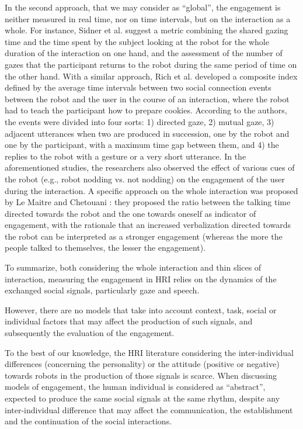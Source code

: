 \documentclass[twocolumn]{svjour3}          %
\renewcommand{\sl}[1]{\color{green} { #1 } \normalcolor}
\begin{document}
In the second approach, that we may consider as ``global'', the engagement is neither measured in real time, nor on time intervals, but on the interaction as a whole. 
For instance, Sidner et al. \cite{sidner2004,sidner2005} suggest a metric combining the shared gazing time and the time spent by the subject looking at the robot for the whole duration of the interaction on one hand, and the assessment of the number of gazes that the participant returns to the robot during the same period of time on the other hand. 
With a similar approach, Rich et al. \cite{rich2010recognizing} developed a composite index defined by the average time intervals between two social connection events between the robot and the user in the course of an interaction, where the robot had to teach the participant how to prepare cookies. According to the authors, the events were divided into four sorts: 1) directed gaze, 2) mutual gaze, 3) adjacent utterances when two are produced in succession, one by the robot and one by the participant, with a maximum time gap between them, and 4) the replies to the robot with a gesture or a very short utterance. 
In the aforementioned studies, the researchers also observed the effect of various cues of the robot (e.g., robot nodding vs. not nodding) on the engagement of the user during the interaction.
A specific approach on the whole interaction was proposed by Le Maitre and Chetouani \cite{Lemaitre2013}: they proposed the ratio between the talking time directed towards the robot and the one towards oneself as indicator of engagement, with the rationale that an increased verbalization directed towards the robot can be interpreted as a stronger engagement (whereas the more the people talked to themselves, the lesser the engagement). 

To summarize, both considering the whole interaction and thin slices of interaction, measuring the engagement in HRI relies on the dynamics of the exchanged social signals, particularly gaze and speech.

However, there are no models that take into account context, task, social or individual factors that may affect the production of such signals, and subsequently the evaluation of the engagement. 

To the best of our knowledge, the HRI literature considering the inter-individual differences (concerning the personality) or the attitude (positive or negative) towards robots in the production of those signals is scarce. 
When discussing models of engagement, the human individual is considered as ``abstract'', expected to produce the same social signals at the same rhythm, despite any inter-individual difference that may affect the communication, the establishment and the continuation of the social interactions. 
\end{document}

